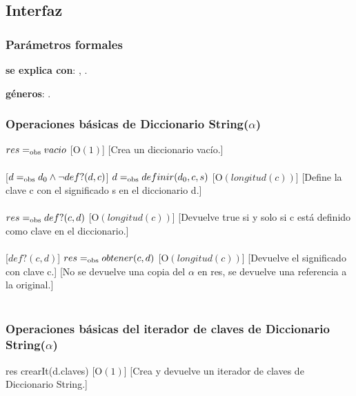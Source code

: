 \subsection{Interfaz}

  \subsubsection{Par\'ametros formales}

  \textbf{se explica con}: , .

  \textbf{g\'eneros}: . %

  \subsubsection{Operaciones b\'asicas de Diccionario String($\alpha$)}
  {$res =_{\mathrm{obs}} vacio$}%
  [O$(1)$]
  [Crea un diccionario vac\'io.]\\\\
  [$d =_{\mathrm{obs}} d_0 \wedge \neg def?(d,c)$]
  {$d =_{\mathrm{obs}} definir(d_0,c,s)$}%
  [O$(longitud(c))$]
  [Define la clave c con el significado s en el diccionario d.]\\\\
  {$res =_{\mathrm{obs}} def?(c,d)$}%
  [O$(longitud(c))$]
  [Devuelve true si y solo si c est\'a definido como clave en el diccionario.]\\\\
  [$def?(c,d)$]
  {$res =_{\mathrm{obs}} obtener(c,d)$}%
  [O$(longitud(c))$]
  [Devuelve el significado con clave c.]
  [No se devuelve una copia del $\alpha$ en res, se devuelve una referencia a la original.]\\\\

 \subsubsection{Operaciones b\'asicas del iterador de claves de Diccionario String($\alpha$)}
  {res \igobs crearIt(d.claves) }
  [O$(1)$]
  [Crea y devuelve un iterador de claves de Diccionario String.]\\\\

